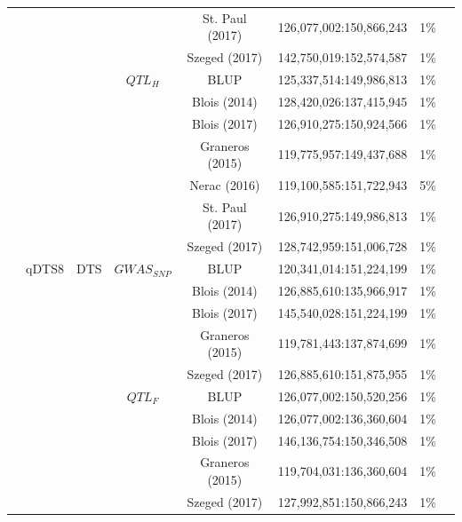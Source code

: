 \documentclass[9pt,twocolumn,twoside]{gsag3jnl}
\begin{document}
\begin{longtable}{c c c c c c c c}
&  & & & St. Paul (2017) & 126,077,002:150,866,243 & 1\% \\
&  & & & Szeged (2017) & 142,750,019:152,574,587 & 1\% \\
&  & & $QTL_H$ & BLUP & 125,337,514:149,986,813 & 1\% \\
&  & & & Blois (2014) & 128,420,026:137,415,945 & 1\% \\
&  & & & Blois (2017) & 126,910,275:150,924,566 & 1\% \\
&  & & & Graneros (2015) & 119,775,957:149,437,688 & 1\% \\
&  & & & Nerac (2016) & 119,100,585:151,722,943 & 5\% \\
&  & & & St. Paul (2017) & 126,910,275:149,986,813 & 1\% \\
&  & & & Szeged (2017) & 128,742,959:151,006,728 & 1\% \\

&  qDTS8 & DTS & $GWAS_{SNP}$ & BLUP & 120,341,014:151,224,199 & 1\% \\
&  & & & Blois (2014) & 126,885,610:135,966,917 & 1\% \\
&  & & & Blois (2017) & 145,540,028:151,224,199 & 1\% \\
&  & & & Graneros (2015) & 119,781,443:137,874,699 & 1\% \\
&  & & & Szeged (2017) & 126,885,610:151,875,955 & 1\% \\
& & & $QTL_F$ & BLUP & 126,077,002:150,520,256 & 1\% \\
&  & & & Blois (2014) & 126,077,002:136,360,604 & 1\% \\
&  & & & Blois (2017) & 146,136,754:150,346,508 & 1\% \\
&  & & & Graneros (2015) & 119,704,031:136,360,604 & 1\% \\
&  & & & Szeged (2017) & 127,992,851:150,866,243 & 1\% \\


\end{longtable}
\end{document}
